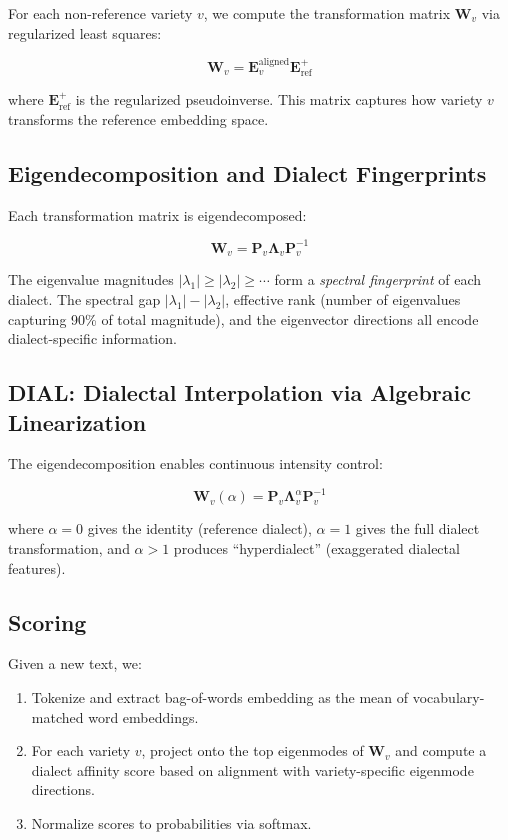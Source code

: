 \documentclass[11pt,a4paper]{article}
\newcommand{\bW}{\mathbf{W}}
\newcommand{\bP}{\mathbf{P}}
\newcommand{\bE}{\mathbf{E}}
\begin{document}
For each non-reference variety $v$, we compute the transformation matrix
$\bW_v$ via regularized least squares:

\begin{equation}
    \bW_v = \bE_v^{\text{aligned}} \bE_{\text{ref}}^{+}
\end{equation}

where $\bE_{\text{ref}}^{+}$ is the regularized pseudoinverse. This matrix
captures how variety $v$ transforms the reference embedding space.

\subsection{Eigendecomposition and Dialect Fingerprints}

Each transformation matrix is eigendecomposed:

\begin{equation}
    \bW_v = \bP_v \boldsymbol{\Lambda}_v \bP_v^{-1}
\end{equation}

The eigenvalue magnitudes $|\lambda_1| \geq |\lambda_2| \geq \cdots$ form
a \emph{spectral fingerprint} of each dialect. The spectral gap
$|\lambda_1| - |\lambda_2|$, effective rank (number of eigenvalues capturing
90\% of total magnitude), and the eigenvector directions all encode
dialect-specific information.

\subsection{DIAL: Dialectal Interpolation via Algebraic Linearization}

The eigendecomposition enables continuous intensity control:

\begin{equation}
    \bW_v(\alpha) = \bP_v \boldsymbol{\Lambda}_v^{\alpha} \bP_v^{-1}
\end{equation}

where $\alpha = 0$ gives the identity (reference dialect), $\alpha = 1$ gives
the full dialect transformation, and $\alpha > 1$ produces ``hyperdialect''
(exaggerated dialectal features).

\subsection{Scoring}

Given a new text, we:
\begin{enumerate}
    \item Tokenize and extract bag-of-words embedding as the mean of
    vocabulary-matched word embeddings.
    \item For each variety $v$, project onto the top eigenmodes of $\bW_v$ and
    compute a dialect affinity score based on alignment with
    variety-specific eigenmode directions.
    \item Normalize scores to probabilities via softmax.
\end{enumerate}
\end{document}
